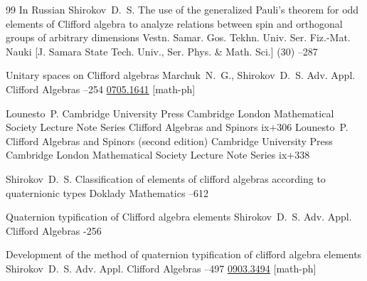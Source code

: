 \begin{thebibliography}{99}
\lang In Russian
\by Shirokov~D.~S.
\paper The use of the generalized Pauli's theorem for odd elements of Clifford algebra
to analyze relations between spin and orthogonal groups of arbitrary dimensions
\jour Vestn. Samar. Gos. Tekhn. Univ. Ser. Fiz.-Mat. Nauki \rm [J. Samara State Tech. Univ., Ser. Phys. \& Math. Sci.]
(30)
--287


\paper Unitary spaces on Clifford algebras
\by Marchuk~N.~G., Shirokov~D.~S.
\jour Adv. Appl. Clifford Algebras
--254
\arxiv \href{http://arxiv.org/abs/0705.1641}{0705.1641}  [math-ph]

\by Lounesto~P.
\publ Cambridge University Press
\publaddr Cambridge
\serial 	London Mathematical Society Lecture Note Series	
\book Clifford Algebras and Spinors
\totalpages ix+306 
\moreref
\by Lounesto~P.
\book Clifford Algebras and Spinors \rm (second edition)
\publ Cambridge University Press
\publaddr Cambridge 
\serial 	London Mathematical Society Lecture Note Series	
\totalpages ix+338


\by Shirokov~D.~S.
\paper Classification of elements of clifford algebras according to quaternionic types
\jour Doklady Mathematics
--612


\paper Quaternion typification of Clifford algebra elements
\by Shirokov~D.~S.
\jour Adv. Appl. Clifford Algebras
-256

\paper Development of the method of quaternion typification of clifford algebra elements
\by Shirokov~D.~S.
\jour Adv. Appl. Clifford Algebras
--497
\arxiv \href{http://arxiv.org/abs/0903.3494}{0903.3494}  [math-ph]

\end{thebibliography}

\EngDate

\newpage
\Russian

%
%
